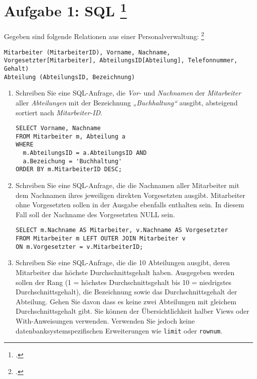 \documentclass{lehramt-informatik-aufgabe}
\begin{document}
\section{Aufgabe 1: SQL
\footcite[Thema 1 Teilaufgabe 1 Aufgabe 4]{examen:66116:2016:09}}

Gegeben sind folgende Relationen aus einer Personalverwaltung:
\footcite{db:pu:3}

\begin{verbatim}
Mitarbeiter (MitarbeiterID), Vorname, Nachname, Vorgesetzter[Mitarbeiter], AbteilungsID[Abteilung], Telefonnummer, Gehalt)
Abteilung (AbteilungsID, Bezeichnung)
\end{verbatim}

\begin{enumerate}


\item Schreiben Sie eine SQL-Anfrage, die \emph{Vor-} und
\emph{Nachnamen} der \emph{Mitarbeiter} aller \emph{Abteilungen} mit der
Bezeichnung \emph{„Buchhaltung“} ausgibt, absteigend sortiert nach
\emph{Mitarbeiter-ID}.

\begin{antwort}
\begin{verbatim}
SELECT Vorname, Nachname
FROM Mitarbeiter m, Abteilung a
WHERE
  m.AbteilungsID = a.AbteilungsID AND
  a.Bezeichung = 'Buchhaltung'
ORDER BY m.MitarbeiterID DESC;
\end{verbatim}
\end{antwort}


\item Schreiben Sie eine SQL-Anfrage, die die Nachnamen aller
Mitarbeiter mit dem Nachnamen ihres jeweiligen direkten Vorgesetzten
ausgibt. Mitarbeiter ohne Vorgesetzten sollen in der Ausgabe ebenfalls
enthalten sein. In diesem Fall soll der Nachname des Vorgesetzten NULL
sein.

\begin{antwort}
\begin{verbatim}
SELECT m.Nachname AS Mitarbeiter, v.Nachname AS Vorgesetzter
FROM Mitarbeiter m LEFT OUTER JOIN Mitarbeiter v
ON m.Vorgesetzter = v.MitarbeiterID;
\end{verbatim}
\end{antwort}


\item Schreiben Sie eine SQL-Anfrage, die die 10 Abteilungen ausgibt,
deren Mitarbeiter das höchste Durchschnittsgehalt haben. Ausgegeben
werden sollen der Rang (1 = höchstes Durchschnittsgehalt bis 10 =
niedrigstes Durchschnittsgehalt), die Bezeichnung sowie das
Durchschnittsgehalt der Abteilung. Gehen Sie davon dass es keine zwei
Abteilungen mit gleichem Durchschnittsgehalt gibt. Sie können der
Übersichtlichkeit halber Views oder With-Anweisungen verwenden.
Verwenden Sie jedoch keine datenbanksystemspezifischen Erweiterungen wie
\verb|limit| oder \verb|rownum|.


\end{enumerate}
\end{document}

